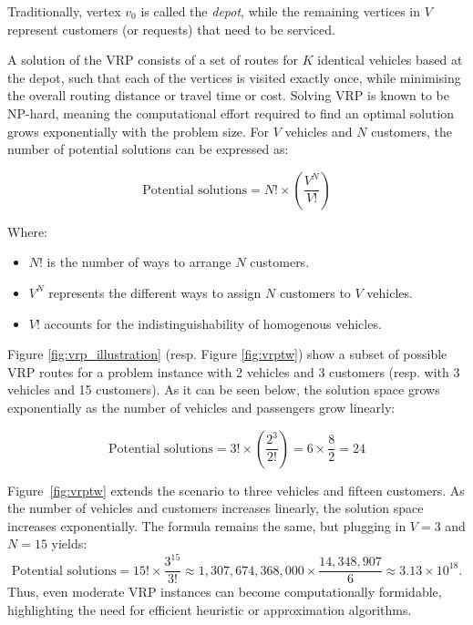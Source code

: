 Traditionally, vertex $v_0$ is called the \textit{depot}, while the remaining vertices in $V$ represent customers (or requests) that need to be serviced. 

A solution of the VRP consists of a set of routes for $K$ identical vehicles based at the depot, such that each of the vertices is visited exactly once, while minimising the overall routing distance or travel time or cost. Solving VRP is known to be NP-hard, meaning the computational effort required to find an optimal solution grows exponentially with the problem size. For \( V \) vehicles and \( N \) customers, the number of potential solutions can be expressed as:

\[
\text{Potential solutions} = N! \times \left( \frac{V^N}{V!} \right)
\]

Where:
\begin{itemize}
    \item \( N! \) is the number of ways to arrange \( N \) customers.
    \item \( V^N \) represents the different ways to assign \( N \) customers to \( V \) vehicles.
    \item \( V! \) accounts for the indistinguishability of homogenous vehicles.
\end{itemize}

Figure \ref{fig:vrp_illustration} (resp. Figure \ref{fig:vrptw}) show a subset of possible VRP routes for a problem instance with 2 vehicles and 3 customers (resp. with 3 vehicles and 15 customers). As it can be seen below, the solution space grows exponentially as the number of vehicles and passengers grow linearly: 

\[
\text{Potential solutions} = 3! \times \left( \frac{2^3}{2!} \right) = 6 \times \frac{8}{2} = 24
\]

Figure~\ref{fig:vrptw} extends the scenario to three vehicles and fifteen customers. As the number of vehicles and customers increases linearly, the solution space increases exponentially. The formula remains the same, but plugging in \(V = 3\) and \(N = 15\) yields:
\[
\text{Potential solutions} 
= 15! \times \frac{3^{15}}{3!}
\approx 1{,}307{,}674{,}368{,}000 
\times \frac{14{,}348{,}907}{6}
\approx 3.13 \times 10^{18}.
\]
Thus, even moderate VRP instances can become computationally formidable, highlighting the need for efficient heuristic or approximation algorithms.


